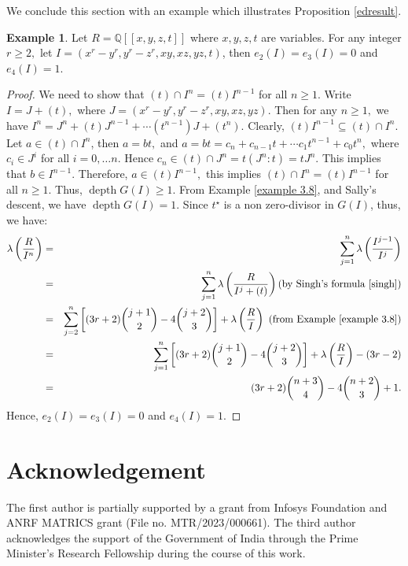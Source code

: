 \documentclass[reqno,a4paper,dvipsnames]{amsart}
\newcommand{\depth}{\operatorname{depth}}
\theoremstyle{definition}
\newtheorem{example}[theorem]{Example}
\begin{document}
We conclude this section with an example which illustrates Proposition \ref{edresult}.

\begin{example}
\label{example e4=1}
Let $R=\mathbb{Q}[[x,y,z,t]]$ where $x,y,z,t$ are variables. For any integer $r \geq 2,$ let $I = (x^r-y^r, y^r-z^r, xy, xz, yz, t)$, then  $e_2(I)=e_3(I)=0$ and $e_{4}(I)=1.$
 \end{example}
\begin{proof} 
   We need to show that $(t) \cap I^n = (t)I^{n-1}$  for all $n \geq 1$. Write $I = J + (t),$ where $J = (x^r-y^r, y^r-z^r, xy, xz, yz)$. Then for any $n \geq 1,$ we have 
$I^n = J^n + (t) J^{n-1} + \cdots (t^{n-1})J + (t^n)$. Clearly, $(t) I^{n-1} \subseteq (t) \cap I^n.$  Let $a \in (t) \cap I^n$, then $a = bt,$ and $a = bt = c_{n} + c_{n-1}t + \cdots c_1 t^{n-1} + c_0 t^n,$ where $c_i \in J^i$ for all $i=0,\ldots n $. 
Hence $c_n \in (t) \cap J^n = t(J^n:t) = t J^n $. This implies that $b \in I^{n-1}$. Therefore, $a \in (t) I^{n-1},$ this implies $(t) \cap I^n = (t)I^{n-1}$ for all $n \geq 1.$ Thus, $\depth G(I) \geq 1.$ From Example \ref{example 3.8}, and Sally's descent, we have $\depth G(I)=1$. Since $t^{\star}$ is a non zero-divisor in $G(I)$, thus, we have:
\begin{eqnarray*}  
\lambda \left( \frac{R}{I^n} \right) &=&\sum_{j=1}^n \lambda \left( \frac{I^{j-1}}{I^j} \right) \\
&=& \sum_{j=1}^n\lambda \left( \frac{R}{I^j + (t)} \right) \text{(by Singh's formula \cite{singh})} \\ 
&=& \sum_{j=2}^n \left[  (3r+2) \binom{j+1}{2} - 4 \binom{j+2}{3}\right] + \lambda\left(\frac{R}{I}\right)  \mbox{ (from Example \ref{example 3.8})}\\ 
&=& \sum_{j=1}^n \left[  (3r+2) \binom{j+1}{2} - 4 \binom{j+2}{3}\right] + \lambda\left(\frac{R}{I}\right)-(3r-2)\\
&=& (3r+2) \binom{n+3}{4} - 4 \binom{n+2}{3} + 1.
\end{eqnarray*}
Hence, $e_{2}(I)=e_{3}(I)=0$ and $e_{4}(I)=1.$
\end{proof}


\section*{Acknowledgement}
The first author is partially supported by a grant from Infosys Foundation and ANRF  MATRICS grant (File no. MTR/2023/000661). 
 The third author acknowledges the support of the Government of India through the Prime Minister's Research Fellowship during the course of this work.
\end{document}
